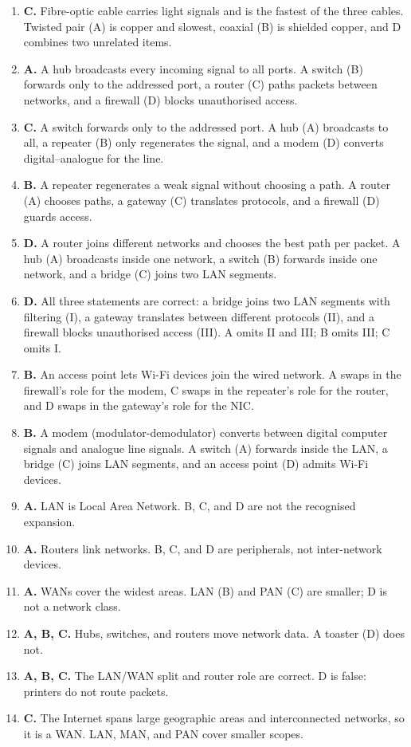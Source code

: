 \begin{enumerate}[label=\textbf{Q\arabic*.}, leftmargin=*]
  (wired) media. B, C, and D each list unguided (wireless) media: radio
  waves, microwaves, satellite links, infrared, or Bluetooth.
\item \textbf{C.} Fibre-optic cable carries light signals and is the fastest
  of the three cables. Twisted pair (A) is copper and slowest, coaxial (B) is
  shielded copper, and D combines two unrelated items.
\item \textbf{A.} A hub broadcasts every incoming signal to all ports. A
  switch (B) forwards only to the addressed port, a router (C) paths packets
  between networks, and a firewall (D) blocks unauthorised access.
\item \textbf{C.} A switch forwards only to the addressed port. A hub (A)
  broadcasts to all, a repeater (B) only regenerates the signal, and a modem
  (D) converts digital--analogue for the line.
\item \textbf{B.} A repeater regenerates a weak signal without choosing a
  path. A router (A) chooses paths, a gateway (C) translates protocols, and
  a firewall (D) guards access.
\item \textbf{D.} A router joins different networks and chooses the best
  path per packet. A hub (A) broadcasts inside one network, a switch (B)
  forwards inside one network, and a bridge (C) joins two LAN segments.
\item \textbf{D.} All three statements are correct: a bridge joins two LAN
  segments with filtering (I), a gateway translates between different
  protocols (II), and a firewall blocks unauthorised access (III). A omits
  II and III; B omits III; C omits I.
\item \textbf{B.} An access point lets Wi-Fi devices join the wired network.
  A swaps in the firewall's role for the modem, C swaps in the repeater's
  role for the router, and D swaps in the gateway's role for the NIC.
\item \textbf{B.} A modem (modulator-demodulator) converts between digital
  computer signals and analogue line signals. A switch (A) forwards inside
  the LAN, a bridge (C) joins LAN segments, and an access point (D) admits
  Wi-Fi devices.

\item \textbf{A.} LAN is Local Area Network. B, C, and D are not the recognised expansion.
\item \textbf{A.} Routers link networks. B, C, and D are peripherals, not inter-network devices.
\item \textbf{A.} WANs cover the widest areas. LAN (B) and PAN (C) are smaller; D is not a network class.
\item \textbf{A, B, C.} Hubs, switches, and routers move network data. A toaster (D) does not.
\item \textbf{A, B, C.} The LAN/WAN split and router role are correct. D is false: printers do not route packets.
\item \textbf{C.} The Internet spans large geographic areas and interconnected networks, so it is a WAN. LAN, MAN, and PAN cover smaller scopes.


\end{enumerate}
